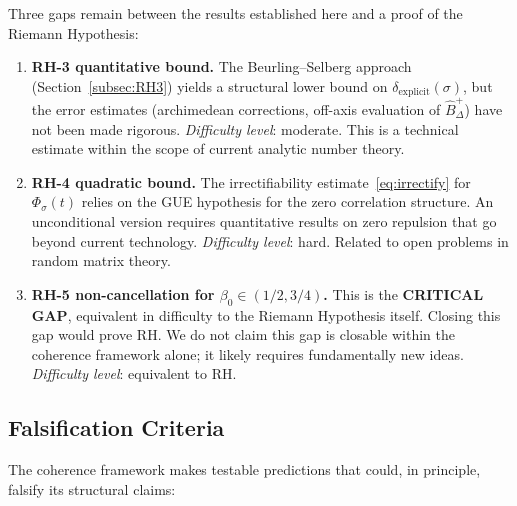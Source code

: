 \documentclass[11pt]{article}
\theoremstyle{remark}
\begin{document}
Three gaps remain between the results established here and a proof of the
Riemann Hypothesis:

\begin{enumerate}
  \item \textbf{RH-3 quantitative bound.}
    The Beurling--Selberg approach (Section~\ref{subsec:RH3}) yields a structural
    lower bound on $\delta_{\mathrm{explicit}}(\sigma)$, but the error estimates
    (archimedean corrections, off-axis evaluation of $\hat{B}^+_\Delta$) have
    not been made rigorous.
    \emph{Difficulty level}: moderate.  This is a technical estimate within the
    scope of current analytic number theory.

  \item \textbf{RH-4 quadratic bound.}
    The irrectifiability estimate~\eqref{eq:irrectify} for $\Phi_\sigma(t)$
    relies on the GUE hypothesis for the zero correlation structure.
    An unconditional version requires quantitative results on zero repulsion
    that go beyond current technology.
    \emph{Difficulty level}: hard.  Related to open problems in random matrix
    theory.

  \item \textbf{RH-5 non-cancellation for $\beta_0\in(1/2,3/4)$.}
    This is the \textbf{CRITICAL GAP}, equivalent in difficulty to the Riemann
    Hypothesis itself.  Closing this gap would prove RH.
    We do not claim this gap is closable within the coherence framework alone;
    it likely requires fundamentally new ideas.
    \emph{Difficulty level}: equivalent to RH.
\end{enumerate}

\subsection{Falsification Criteria}
\label{subsec:falsification}

The coherence framework makes testable predictions that could, in principle,
falsify its structural claims:
\end{document}
